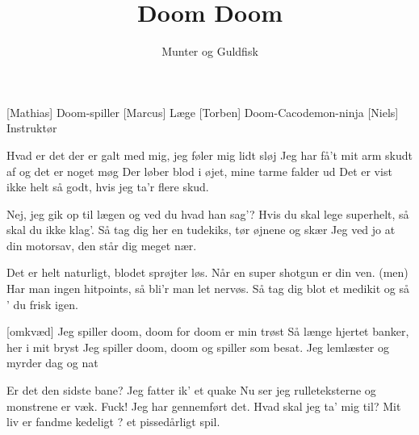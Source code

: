 \documentclass[a4paper,11pt]{article}
\title{Doom Doom}
\author{Munter og Guldfisk}
\begin{document}
\maketitle

\begin{roles}
[Mathias] Doom-spiller
[Marcus] Læge
[Torben] Doom-Cacodemon-ninja
[Niels] Instruktør
\end{roles}

\begin{props}
\end{props}


\begin{song}

%
Hvad er det der er galt med mig, jeg føler mig lidt sløj
Jeg har få't mit arm skudt af og det er noget møg
Der løber blod i øjet, mine tarme falder ud
Det er vist ikke helt så godt, hvis jeg ta'r flere skud.


%
Nej, jeg gik op til lægen og ved du hvad han sag'?
%
Hvis du skal lege superhelt, så skal du ikke klag'. 
Så tag dig her en tudekiks, tør øjnene og skær
Jeg ved jo at din motorsav, den står dig meget nær.

%
Det er helt naturligt, blodet sprøjter løs.
Når en super shotgun er din ven.
(men) Har man ingen hitpoints, så bli'r man let nervøs.
Så tag dig blot et medikit og så ' du frisk igen.




[omkvæd]
Jeg spiller doom, doom for doom er min trøst
Så længe hjertet banker, her i mit bryst
Jeg spiller doom, doom og spiller som besat.
Jeg lemlæster og myrder dag og nat


%
Er det den sidste bane? Jeg fatter ik' et quake
Nu ser jeg rulleteksterne og monstrene er væk.
Fuck! Jeg har gennemført det. Hvad skal jeg ta' mig til?
Mit liv er fandme kedeligt ? et pissedårligt spil.


\end{song}
\end{document}
